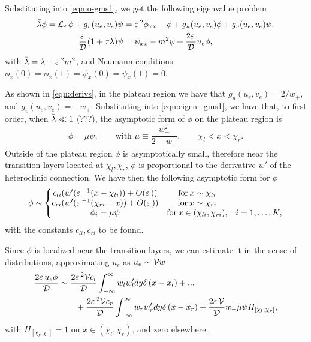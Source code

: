 Substituting into \eqref{eqn:o-gms1}, we get the following eigenvalue problem
%
\begin{subequations}
\begin{align}
\label{eqn:eigen_gms1}
  \bar{\lambda}\phi = \mathcal{L}_{\varepsilon\,}\phi + g_v(u_e,v_e)\psi &= \varepsilon\,^2\phi_{xx} - \phi + g_u(u_e,v_e)\phi + g_v(u_e,v_e)\psi,\\
\label{eqn:eigen_gms2}
  \frac{\varepsilon\,}{\mathcal{D}}(1+\tau\lambda)\psi &= \psi_{xx} - m^2\psi + \frac{2\varepsilon\,}{\mathcal{D}}u_e\phi,
\end{align}
\end{subequations}
% 
with $\bar{\lambda} = \lambda + \varepsilon\,^2m^2$, and Neumann conditions $\phi_x(0)=\phi_x(1)=\psi_x(0)=\psi_x(1)=0$.

As shown in \eqref{eqn:derivs}, in the plateau region we have that $g_u(u_e,v_e) = 2/w_+$, and $g_v(u_e,v_e) = -w_+$. Substituting into \eqref{eqn:eigen_gms1}, we have that, to first order, when $\bar{\lambda}\ll 1$ (???), the asymptotic form of $\phi$ on the plateau region is 
% 
\begin{equation*}
  \phi = \mu\psi,\qquad \textrm{with  }\mu \equiv \frac{w_+^2}{2-w_+},\qquad \chi_l<x<\chi_r.
\end{equation*}
% 
Outside of the plateau region $\phi$ is asymptotically small, therefore near the transition layers located at $\chi_l,\chi_r$, $\phi$ is proportional to the derivative $w'$ of the heteroclinic connection. We have then the following asymptotic form for $\phi$
% 
\begin{equation*}
	\begin{split}
	\phi
   \sim \left\{
	\begin{matrix}
		c_{li}(w'(\varepsilon\,^{-1}(x-\chi_{li}))+O(\varepsilon\,))& \mathrm{for}\hspace{2pt} x\sim\chi_{li}& \\
		c_{ri}(w'(\varepsilon\,^{-1}(\chi_{ri}-x))+O(\varepsilon\,))& \mathrm{for}\hspace{2pt} x\sim\chi_{ri}& \\
		\phi_i = \mu\psi& \mathrm{for}\hspace{2pt}x\in(\chi_{li},\chi_{ri}),&i=1,\hdots,K,
	\end{matrix}\right.
	\end{split}
\end{equation*}
% 
with the constants $c_{li},c_{ri}$ to be found.

Since $\phi$ is localized near the transition layers, we can estimate it in the sense of distributions, approximating $u_e$ as $u_e\sim\mathcal{V} w$
% 
\begin{equation*}
\begin{split}
\begin{aligned}
  \frac{2\varepsilon\, u_e\phi}{\mathcal{D}}&\sim \frac{2\varepsilon\,^2\mathcal{V} c_l}{\mathcal{D}}\int_{-\infty}^{\infty}w_lw_l'dy\delta\,(x-x_l) +...\\ 
  &\qquad+\frac{2\varepsilon\,^2\mathcal{V} c_r}{\mathcal{D}}\int_{-\infty}^{\infty}w_rw_r'dy\delta\,(x-x_r) + \frac{2\varepsilon\,\mathcal{V}}{\mathcal{D}}w_+\mu\psi H_{[\chi_l,\chi_r]},
\end{aligned}
\end{split}
\end{equation*}
% 
with $H_{[\chi_l,\chi_r]} = 1$ on $x\in (\chi_l,\chi_r)$, and zero elsewhere.

